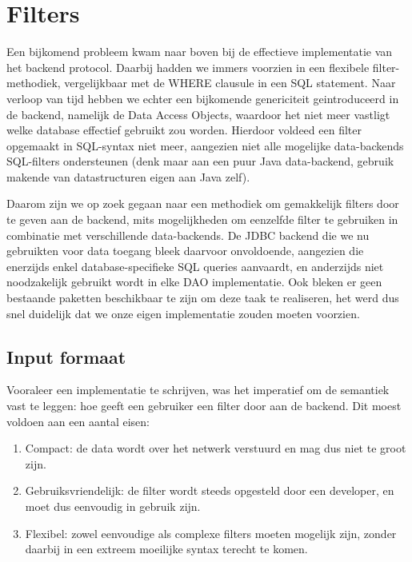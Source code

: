 \chapter{Filters}

Een bijkomend probleem kwam naar boven bij de effectieve implementatie van het backend protocol. Daarbij hadden we immers voorzien in een flexibele filter-methodiek, vergelijkbaar met de WHERE clausule in een SQL statement.
Naar verloop van tijd hebben we echter een bijkomende genericiteit geintroduceerd in de backend, namelijk de Data Access Objects, waardoor het niet meer vastligt welke database effectief gebruikt zou worden. Hierdoor voldeed een filter opgemaakt in SQL-syntax niet meer, aangezien niet alle mogelijke data-backends SQL-filters ondersteunen (denk maar aan een puur Java data-backend, gebruik makende van datastructuren eigen aan Java zelf).

Daarom zijn we op zoek gegaan naar een methodiek om gemakkelijk filters door te geven aan de backend, mits mogelijkheden om eenzelfde filter te gebruiken in combinatie met verschillende data-backends. De JDBC backend die we nu gebruikten voor data toegang bleek daarvoor onvoldoende, aangezien die enerzijds enkel database-specifieke SQL queries aanvaardt, en anderzijds niet noodzakelijk gebruikt wordt in elke DAO implementatie. Ook bleken er geen bestaande paketten beschikbaar te zijn om deze taak te realiseren, het werd dus snel duidelijk dat we onze eigen implementatie zouden moeten voorzien.

\section{Input formaat}

Vooraleer een implementatie te schrijven, was het imperatief om de semantiek vast te leggen: hoe geeft een gebruiker een filter door aan de backend. Dit moest voldoen aan een aantal eisen:
\begin{enumerate}
\item Compact: de data wordt over het netwerk verstuurd en mag dus niet te groot zijn.
\item Gebruiksvriendelijk: de filter wordt steeds opgesteld door een developer, en moet dus eenvoudig in gebruik zijn.
\item Flexibel: zowel eenvoudige als complexe filters moeten mogelijk zijn, zonder daarbij in een extreem moeilijke syntax terecht te komen.
\end{enumerate}


